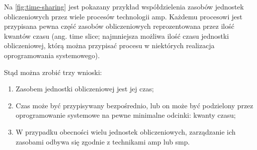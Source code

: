 \documentclass[../main]{subfiles}
\begin{document}
Na \cref{fig:time-sharing} jest pokazany przykład współdzielenia zasobów jednostek obliczeniowych przez wiele procesów technologii \acrshort{amp}. Każdemu procesowi jest przypisana pewna część zasobów obliczeniowych reprozentowana przez ilość kwantów czasu (ang. time slice; najmniejsza możliwa ilość czasu jednostki obliczeniowej, którą można przypisać procesu w niektórych realizacja oprogramowania systemowego).

Stąd można zrobić trzy wnioski:

\begin{enumerate}
    \item Zasobem jednostki obliczeniowej jest jej czas;
    \item Czas może być przypisywany bezpośrednio, lub on może być podzielony przez oprogramowanie systemowe na pewne minimalne odcinki: kwanty czasu;
    \item W przypadku obecności wielu jednostek obliczeniowych, zarządzanie ich zasobami odbywa się zgodnie z technikami \acrshort{amp} lub \acrshort{smp}.
\end{enumerate}
\end{document}
